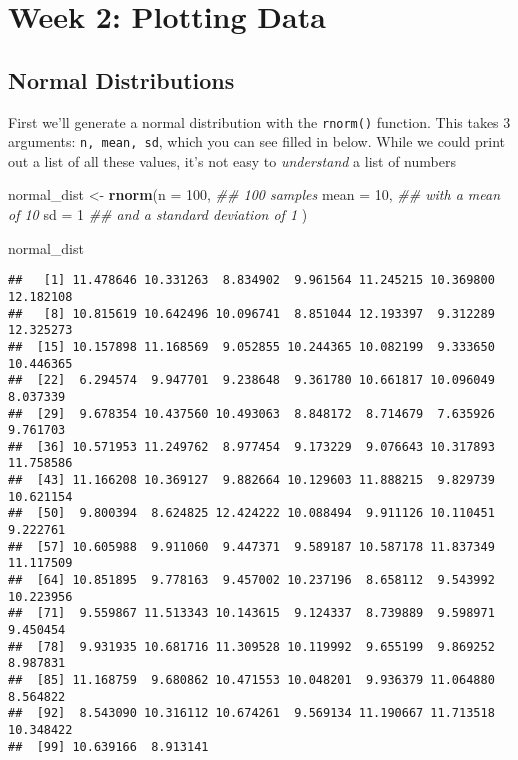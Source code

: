 \documentclass[
]{book}
\newenvironment{Shaded}{\begin{snugshade}}{\end{snugshade}}
\newcommand{\CommentTok}[1]{\textcolor[rgb]{0.56,0.35,0.01}{\textit{#1}}}
\newcommand{\DataTypeTok}[1]{\textcolor[rgb]{0.13,0.29,0.53}{#1}}
\newcommand{\DecValTok}[1]{\textcolor[rgb]{0.00,0.00,0.81}{#1}}
\newcommand{\KeywordTok}[1]{\textcolor[rgb]{0.13,0.29,0.53}{\textbf{#1}}}
\newcommand{\NormalTok}[1]{#1}
\newcommand{\StringTok}[1]{\textcolor[rgb]{0.31,0.60,0.02}{#1}}
\begin{document}
\hypertarget{week-2-plotting-data}{%
\section{Week 2: Plotting Data}\label{week-2-plotting-data}}

\hypertarget{normal-distributions}{%
\subsection{Normal Distributions}\label{normal-distributions}}

First we'll generate a normal distribution with the \texttt{rnorm()} function. This takes 3 arguments: \texttt{n,\ mean,\ sd}, which you can see filled in below. While we could print out a list of all these values, it's not easy to \emph{understand} a list of numbers

\begin{Shaded}
\begin{Highlighting}[]
\NormalTok{normal_dist <-}\StringTok{ }\KeywordTok{rnorm}\NormalTok{(}\DataTypeTok{n =} \DecValTok{100}\NormalTok{, }\CommentTok{## 100 samples}
                     \DataTypeTok{mean =} \DecValTok{10}\NormalTok{, }\CommentTok{## with a mean of 10}
                     \DataTypeTok{sd =} \DecValTok{1} \CommentTok{## and a standard deviation of 1}
\NormalTok{                     )}


\NormalTok{normal_dist}
\end{Highlighting}
\end{Shaded}

\begin{verbatim}
##   [1] 11.478646 10.331263  8.834902  9.961564 11.245215 10.369800 12.182108
##   [8] 10.815619 10.642496 10.096741  8.851044 12.193397  9.312289 12.325273
##  [15] 10.157898 11.168569  9.052855 10.244365 10.082199  9.333650 10.446365
##  [22]  6.294574  9.947701  9.238648  9.361780 10.661817 10.096049  8.037339
##  [29]  9.678354 10.437560 10.493063  8.848172  8.714679  7.635926  9.761703
##  [36] 10.571953 11.249762  8.977454  9.173229  9.076643 10.317893 11.758586
##  [43] 11.166208 10.369127  9.882664 10.129603 11.888215  9.829739 10.621154
##  [50]  9.800394  8.624825 12.424222 10.088494  9.911126 10.110451  9.222761
##  [57] 10.605988  9.911060  9.447371  9.589187 10.587178 11.837349 11.117509
##  [64] 10.851895  9.778163  9.457002 10.237196  8.658112  9.543992 10.223956
##  [71]  9.559867 11.513343 10.143615  9.124337  8.739889  9.598971  9.450454
##  [78]  9.931935 10.681716 11.309528 10.119992  9.655199  9.869252  8.987831
##  [85] 11.168759  9.680862 10.471553 10.048201  9.936379 11.064880  8.564822
##  [92]  8.543090 10.316112 10.674261  9.569134 11.190667 11.713518 10.348422
##  [99] 10.639166  8.913141
\end{verbatim}
\end{document}
